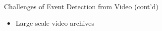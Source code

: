\documentclass{beamer}
\begin{document}
\begin{frame}[t]{Challenges of Event Detection from Video (cont'd)}
\begin{itemize}
\item Large scale video archives
\end{itemize}


\end{frame}
\end{document}

